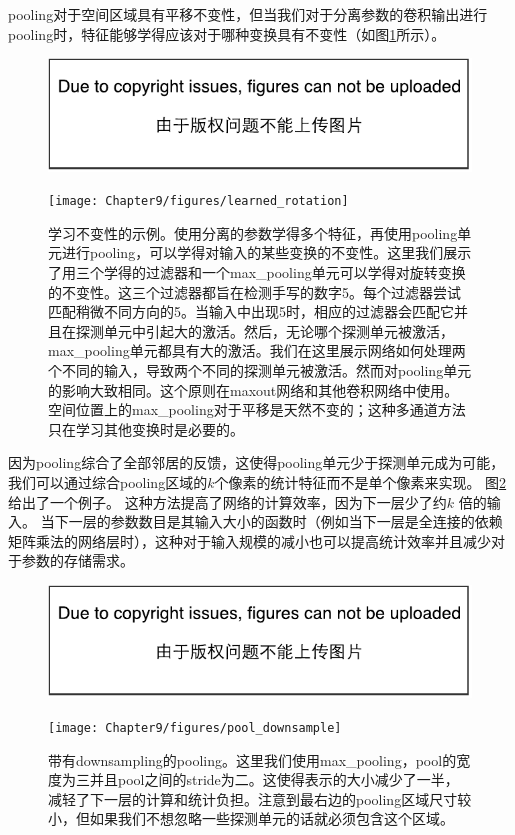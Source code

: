 \gls{pooling}对于空间区域具有平移不变性，但当我们对于分离参数的卷积输出进行\gls{pooling}时，特征能够学得应该对于哪种变换具有不变性（如图\ref{fig:chap9_learned_rotation}所示）。
\begin{figure}[!htb]
\ifOpenSource
\centerline{\includegraphics{figure.pdf}}
\else
\centerline{\texttt{[image: Chapter9/figures/learned\_rotation]}}
\fi
\caption{学习不变性的示例。使用分离的参数学得多个特征，再使用\gls{pooling}单元进行\gls{pooling}，可以学得对输入的某些变换的不变性。这里我们展示了用三个学得的过滤器和一个\gls{max_pooling}单元可以学得对旋转变换的不变性。这三个过滤器都旨在检测手写的数字5。每个过滤器尝试匹配稍微不同方向的5。当输入中出现5时，相应的过滤器会匹配它并且在探测单元中引起大的激活。然后，无论哪个探测单元被激活，\gls{max_pooling}单元都具有大的激活。我们在这里展示网络如何处理两个不同的输入，导致两个不同的探测单元被激活。然而对\gls{pooling}单元的影响大致相同。这个原则在\gls{maxout}网络\citep{Goodfellow-et-al-ICML2013}和其他卷积网络中使用。空间位置上的\gls{max_pooling}对于平移是天然不变的；这种多通道方法只在学习其他变换时是必要的。}
\label{fig:chap9_learned_rotation}
\end{figure}

 
因为\gls{pooling}综合了全部邻居的反馈，这使得\gls{pooling}单元少于探测单元成为可能，我们可以通过综合\gls{pooling}区域的$k$个像素的统计特征而不是单个像素来实现。
图\ref{fig:chap9_pool_downsample}给出了一个例子。
这种方法提高了网络的计算效率，因为下一层少了约$k$ 倍的输入。
当下一层的参数数目是其输入大小的函数时（例如当下一层是全连接的依赖矩阵乘法的网络层时），这种对于输入规模的减小也可以提高统计效率并且减少对于参数的存储需求。
\begin{figure}[!htb]
\ifOpenSource
\centerline{\includegraphics{figure.pdf}}
\else
\centerline{\texttt{[image: Chapter9/figures/pool\_downsample]}}
\fi
\caption{带有\gls{downsampling}的\gls{pooling}。这里我们使用\gls{max_pooling}，\gls{pool}的宽度为三并且\gls{pool}之间的\gls{stride}为二。这使得表示的大小减少了一半，减轻了下一层的计算和统计负担。注意到最右边的\gls{pooling}区域尺寸较小，但如果我们不想忽略一些探测单元的话就必须包含这个区域。}
\label{fig:chap9_pool_downsample}
\end{figure}

